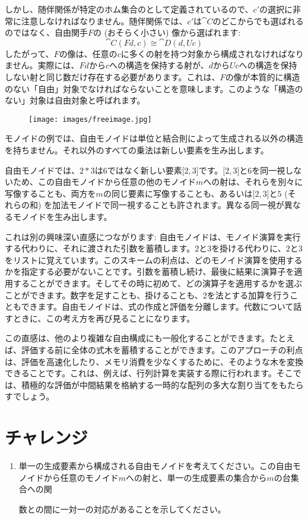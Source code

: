 \noindent
しかし、随伴関係が特定のホム集合のとして定義されているので、$c'$の選択に非常に注意しなければなりません。随伴関係では、$c'$は$\cat{C}$のどこからでも選ばれるのではなく、自由関手$F$の (おそらく小さい) 像から選ばれます:
\[\cat{C}(F d, c) \cong \cat{D}(d, U c)\]
したがって、$F$の像は、任意の$c$に多くの射を持つ対象から構成されなければなりません。実際には、$F d$から$c$への構造を保持する射が、$d$から$U c$への構造を保持しない射と同じ数だけ存在する必要があります。これは、$F$の像が本質的に構造のない「自由」対象でなければならないことを意味します。このような「構造のない」対象は自由対象と呼ばれます。

\begin{figure}[H]
  \centering
  \texttt{[image: images/freeimage.jpg]}
\end{figure}

\noindent
モノイドの例では、自由モノイドは単位と結合則によって生成される以外の構造を持ちません。それ以外のすべての乗法は新しい要素を生み出します。

自由モノイドでは、$2 * 3$は$6$ではなく新しい要素${[}2, 3{]}$です。${[}2, 3{]}$と$6$を同一視しないため、この自由モノイドから任意の他のモノイド$m$への射は、それらを別々に写像することも、両方を$m$の同じ要素に写像することも、あるいは${[}2, 3{]}$と$5$ (それらの和) を加法モノイドで同一視することも許されます。異なる同一視が異なるモノイドを生み出します。

これは別の興味深い直感につながります: 自由モノイドは、モノイド演算を実行する代わりに、それに渡された引数を蓄積します。$2$と$3$を掛ける代わりに、$2$と$3$をリストに覚えています。このスキームの利点は、どのモノイド演算を使用するかを指定する必要がないことです。引数を蓄積し続け、最後に結果に演算子を適用することができます。そしてその時に初めて、どの演算子を適用するかを選ぶことができます。数字を足すことも、掛けることも、2を法とする加算を行うこともできます。自由モノイドは、式の作成と評価を分離します。代数について話すときに、この考え方を再び見ることになります。

この直感は、他のより複雑な自由構成にも一般化することができます。たとえば、評価する前に全体の式木を蓄積することができます。このアプローチの利点は、評価を高速化したり、メモリ消費を少なくするために、そのような木を変換できることです。これは、例えば、行列計算を実装する際に行われます。そこでは、積極的な評価が中間結果を格納する一時的な配列の多大な割り当てをもたらすでしょう。

\section{チャレンジ}

\begin{enumerate}
  \tightlist
  \item
        単一の生成要素から構成される自由モノイドを考えてください。この自由モノイドから任意のモノイド$m$への射と、単一の生成要素の集合から$m$の台集合への関

数との間に一対一の対応があることを示してください。
\end{enumerate}

